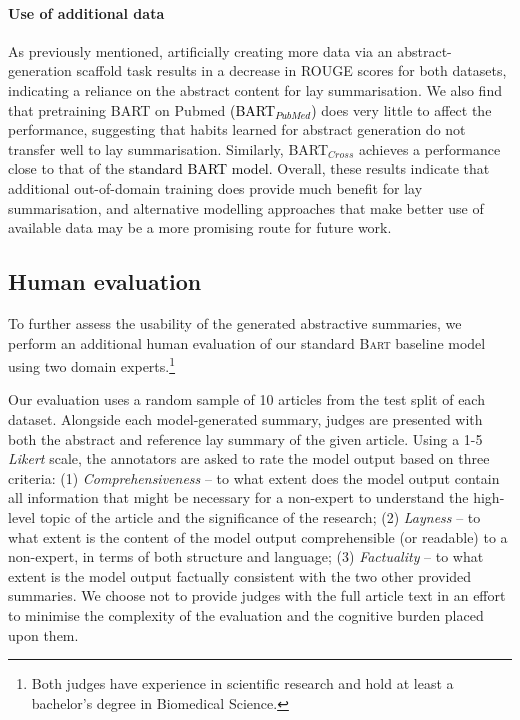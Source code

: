 \documentclass[11pt]{article}
\begin{document}
\paragraph{Use of additional data}
As previously mentioned, artificially creating more data via an abstract-generation scaffold task results in a decrease in ROUGE scores for both datasets, indicating a reliance on the abstract content for lay summarisation.  We also find that pretraining \textsc{BART} on Pubmed \textcolor{black}{(\textsc{BART}$_{PubMed}$)} does very little to affect the performance, suggesting that habits learned for abstract generation do not transfer well to lay summarisation.
Similarly, \textsc{BART}$_{Cross}$ achieves a performance close to that of the 
\textcolor{black}{standard \textsc{BART} model.}
Overall, these results indicate that additional out-of-domain training does provide much benefit for lay summarisation, and alternative modelling approaches that make better use of available data may be a more promising route for future work. 

\subsection{Human evaluation} \label{subsec:results-human}
To further assess the usability of the generated abstractive summaries, we perform an additional human evaluation of our standard \textsc{Bart} baseline model using two domain experts.\footnote{Both judges have experience in scientific research and hold at least a bachelor's degree in Biomedical Science.} 

Our evaluation uses a random sample of 10 articles from the test split of each dataset. Alongside each model-generated summary, judges are presented with both the abstract and reference lay summary of the given article. Using a 1-5 \textit{Likert} scale, the annotators are asked to rate the model output based on three criteria:
(1) \textit{Comprehensiveness} -- to what extent does the model output contain all information that might be necessary for a non-expert to understand the high-level topic of the article and the significance of the research;
(2) \textit{Layness} -- to what extent is the content of the model output comprehensible (or readable) to a non-expert, in terms of both structure and language;
(3) \textit{Factuality} -- to what extent is the model output factually consistent with the two other provided summaries. 
We choose not to provide judges with the full article text in an effort to minimise the complexity of the evaluation and the cognitive burden placed upon them.
\end{document}
